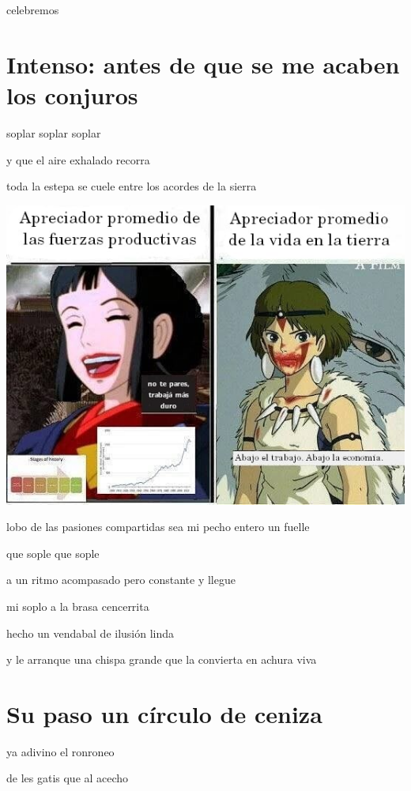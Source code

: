 \documentclass[
]{book}
\begin{document}
celebremos

\hypertarget{intenso-antes-de-que-se-me-acaben-los-conjuros}{%
\chapter{Intenso: antes de que se me acaben los conjuros}\label{intenso-antes-de-que-se-me-acaben-los-conjuros}}

soplar soplar soplar

y que el aire exhalado recorra

toda la estepa se cuele entre los acordes de la sierra

\includegraphics{images/4.png}

lobo de las pasiones compartidas sea mi pecho entero un fuelle

que sople que sople

a un ritmo acompasado pero constante y llegue

mi soplo a la brasa cencerrita

hecho un vendabal de ilusión linda

y le arranque una chispa grande que la convierta en achura viva

\hypertarget{su-paso-un-cuxedrculo-de-ceniza}{%
\chapter{Su paso un círculo de ceniza}\label{su-paso-un-cuxedrculo-de-ceniza}}

ya adivino el ronroneo

de les gatis que al acecho
\end{document}
